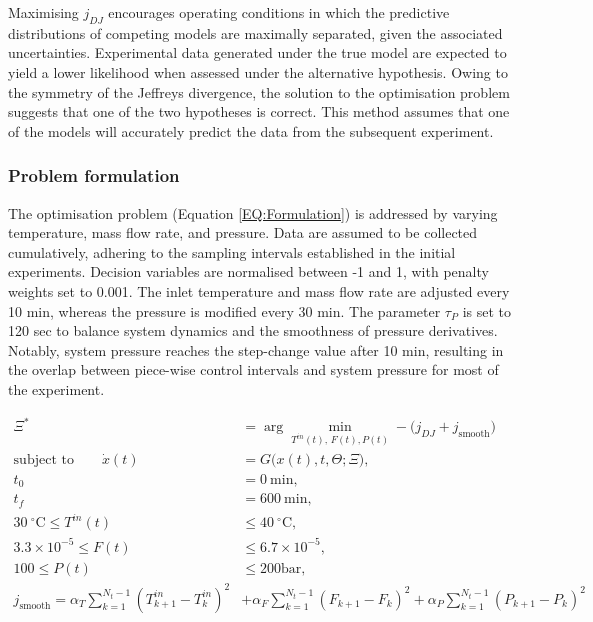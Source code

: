 \documentclass[../Article_Design_of_Experiment.tex]{subfiles}
\begin{document}
	Maximising $j_{DJ}$ encourages operating conditions in which the predictive distributions of competing models are maximally separated, given the associated uncertainties. Experimental data generated under the true model are expected to yield a lower likelihood when assessed under the alternative hypothesis. Owing to the symmetry of the Jeffreys divergence, the solution to the optimisation problem suggests that one of the two hypotheses is correct. This method assumes that one of the models will accurately predict the data from the subsequent experiment.
	
	
	\subsubsection{Problem formulation}
	
	The optimisation problem (Equation \ref{EQ:Formulation}) is addressed by varying temperature, mass flow rate, and pressure. Data are assumed to be collected cumulatively, adhering to the sampling intervals established in the initial experiments. Decision variables are normalised between -1 and 1, with penalty weights set to 0.001. The inlet temperature and mass flow rate are adjusted every 10 min, whereas the pressure is modified every 30 min. The parameter $\tau_P$ is set to 120 sec to balance system dynamics and the smoothness of pressure derivatives. Notably, system pressure reaches the step-change value after 10 min, resulting in the overlap between piece-wise control intervals and system pressure for most of the experiment.
	
	{\footnotesize
		\begin{equation}
			\begin{aligned}
				\Xi^* &= \arg \min_{T^{in}(t),\,F(t), P(t)}
				-\Big(j_{DJ} + j_{\mathrm{smooth}}\Big) \\
				\text{subject to} \qquad
				\dot{x}(t) &= G\big(x(t),t,\Theta;\Xi\big), \\
				t_0 &= 0~\mathrm{min}, \\
				t_f &= 600~\mathrm{min}, \\
				30~\mathrm{^\circ C} \leq T^{in}(t) &\leq 40~\mathrm{^\circ C}, \\
				3.3 \times 10^{-5} \leq F(t) &\leq 6.7 \times 10^{-5}, \\
				100 \leq P(t) &\leq 200 \mathrm{bar}, \\
				j_{\mathrm{smooth}} = 
				\alpha_T \sum_{k=1}^{N_t-1}\left(T^{in}_{k+1}-T^{in}_{k}\right)^2
				&+
				\alpha_F \sum_{k=1}^{N_t-1}\left(F_{k+1}-F_{k}\right)^2
				+
				\alpha_P \sum_{k=1}^{N_t-1}\left(P_{k+1}-P_{k}\right)^2
			\end{aligned}
			\label{EQ:Formulation}
	\end{equation}}
	
\end{document}
